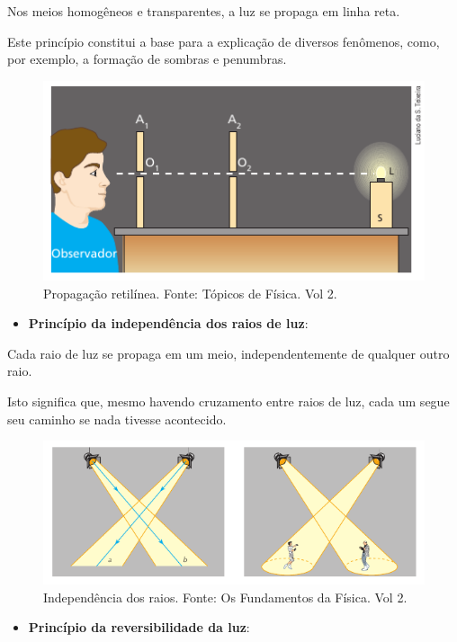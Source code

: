 \documentclass[11pt,twocolumn,oneside]{article}
\begin{document}
Nos meios homogêneos e transparentes, a luz se propaga em linha reta.


Este princípio constitui a base para a explicação de diversos fenômenos, como, por exemplo, a formação de sombras e penumbras.


\begin{figure}[h]{}
\centering\includegraphics[width=2.5truein]{img15.png}
\caption{Propagação retilínea. Fonte: Tópicos de Física. Vol 2.}
\centering
\end{figure}

\begin{itemize}

\item \textbf{Princípio da independência dos raios de luz}:

\end{itemize}


Cada raio de luz se propaga em um meio, independentemente de qualquer outro raio.


Isto significa que, mesmo havendo cruzamento entre raios de luz, cada um segue seu caminho se nada tivesse acontecido.


\begin{figure}[h]{}
\centering\includegraphics[width=2.5truein]{img16.png}
\caption{Independência dos raios. Fonte: Os Fundamentos da Física. Vol 2.}
\centering
\end{figure}

\begin{itemize}

\item \textbf{Princípio da reversibilidade da luz}:

\end{itemize}
\end{document}
